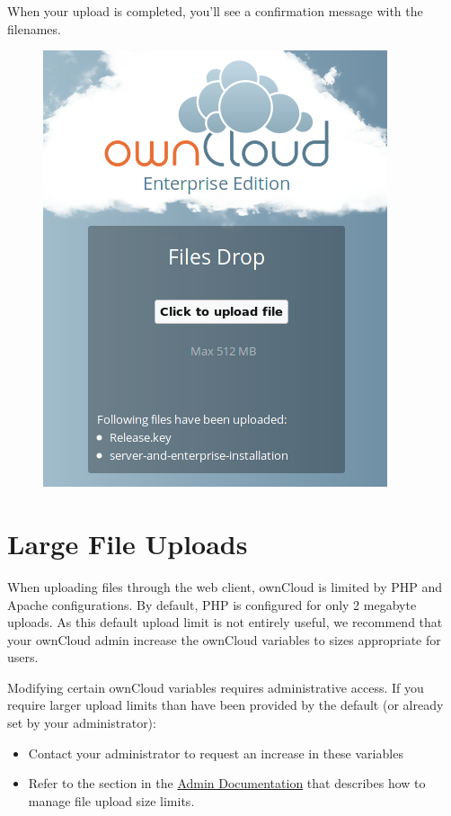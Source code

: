 \documentclass[letterpaper,10pt,english]{sphinxmanual}
\begin{document}
When your upload is completed, you'll see a confirmation message with the
filenames.
\begin{figure}[htbp]
\centering

\includegraphics{files-drop-7.png}
\end{figure}


\section{Large File Uploads}
\label{files/large_file_upload:large-file-uploads}\label{files/large_file_upload::doc}
When uploading files through the web client, ownCloud is limited by PHP and
Apache configurations. By default, PHP is configured for only 2 megabyte
uploads. As this default upload limit is not entirely useful, we recommend that
your ownCloud admin increase the ownCloud variables to sizes appropriate for
users.

Modifying certain ownCloud variables requires administrative access.  If you
require larger upload limits than have been provided by the default (or already
set by your administrator):
\begin{itemize}
\item {} 
Contact your administrator to request an increase in these variables

\item {} 
Refer to the section in the \href{https://doc.owncloud.org/server/9.0/admin\_manual/configuration\_files/big\_file\_upload\_configuration.html}{Admin Documentation} that describes how to manage file
upload size limits.

\end{itemize}
\end{document}
